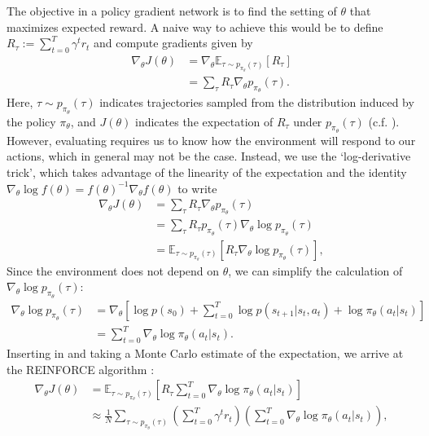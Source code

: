 The objective in a policy gradient network is to find the setting of $\theta$ that maximizes expected reward.
A naive way to achieve this would be to define $R_\tau := \sum_{t=0}^T \gamma^t r_t$ and compute gradients given by
\begin{align}
    \nabla_\theta J(\theta) &= \nabla_\theta \mathbb{E}_{\tau \sim p_{\pi_\theta}(\tau)} \left [ R_\tau \right ]\\
    &= \sum_{\tau} R_\tau \nabla_\theta p_{\pi_\theta}(\tau).
    \label{eq:simple_deriv}
\end{align}
Here, $\tau \sim p_{\pi_\theta}(\tau)$ indicates trajectories sampled from the distribution induced by the policy $\pi_\theta$, and $J(\theta)$ indicates the expectation of $R_\tau$ under $p_{\pi_\theta}(\tau)$ (c.f. ).
However, evaluating  requires us to know how the environment will respond to our actions, which in general may not be the case.
Instead, we use the `log-derivative trick', which takes advantage of the linearity of the expectation and the identity $\nabla_\theta \log f(\theta) = f(\theta)^{-1} \nabla_\theta f(\theta)$ to write
\begin{align}
    \label{eq:deriv_J}
    \nabla_\theta J(\theta) & = \sum_\tau R_\tau \nabla_\theta p_{\pi_\theta}(\tau) \\
                            & = \sum_\tau R_\tau p_{\pi_\theta}(\tau) \nabla_\theta \log p_{\pi_\theta}(\tau) \\
                            & = \mathbb{E}_{\tau \sim p_{\pi_\theta}(\tau)} \left [ R_\tau \nabla_\theta \log p_{\pi_\theta}(\tau) \right ],
\end{align}
Since the environment does not depend on $\theta$, we can simplify the calculation of $\nabla_\theta \log p_{\pi_\theta} (\tau)$:
\begin{align}
    \label{eq:deriv_log_ptau}
    \nabla_\theta \log p_{\pi_\theta}(\tau) & = \nabla_\theta \left [ \log p(s_0) + \sum_{t=0}^T \log p(s_{t+1} | s_t, a_t) + \log \pi_\theta (a_t|s_t) \right ] \\
                                      & = \sum_{t=0}^T \nabla_\theta \log \pi_\theta (a_t|s_t).
\end{align}
Inserting  in  and taking a Monte Carlo estimate of the expectation, we arrive at the REINFORCE algorithm \citep{williams1992simple}:
\begin{align}
    \nabla_\theta J(\theta) & = \mathbb{E}_{\tau \sim p_{\pi_\theta}(\tau)} \left [ R_\tau \sum_{t=0}^T \nabla_\theta \log \pi_\theta (a_t|s_t) \right ]                                         \\
                            & \approx \frac{1}{N} \sum_{\tau \sim p_{\pi_\theta}(\tau)} \left ( \sum_{t=0}^T \gamma^t r_t \right ) \left ( \sum_{t=0}^T \nabla_\theta \log \pi_\theta (a_t|s_t) \right ),
    \label{eq:orig_reinforce}
\end{align}
